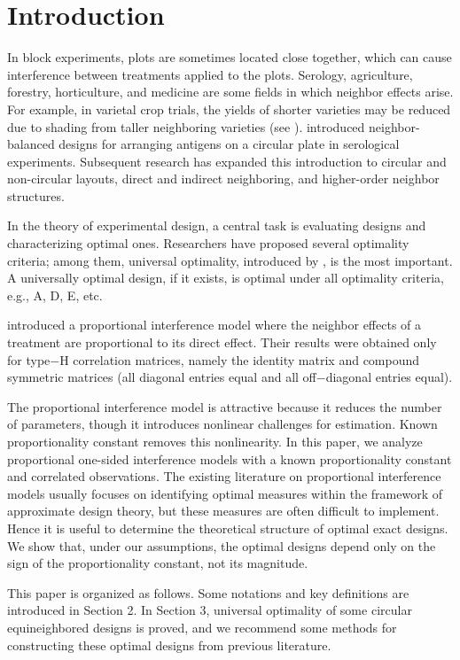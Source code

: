 \documentclass[twoside]{article}
\begin{document}
\section{Introduction}
In block experiments, plots are sometimes located close together, which can cause interference between treatments applied to the plots. Serology, agriculture, forestry, horticulture, and medicine are some fields in which neighbor effects arise. For example, in varietal crop trials, the yields of shorter varieties may be reduced due to shading from taller neighboring varieties (see \cite{KL84}). \cite{R67} introduced neighbor-balanced designs for arranging antigens on a circular plate in serological experiments. Subsequent research has expanded this introduction to circular and non-circular layouts, direct and indirect neighboring, and higher-order neighbor structures.

In the theory of experimental design, a central task is evaluating designs and characterizing optimal ones. Researchers have proposed several optimality criteria; among them, universal optimality, introduced by \cite{K75}, is the most important. A universally optimal design, if it exists, is optimal under all optimality criteria, e.g., A, D, E, etc.

\cite{LZA15} introduced a proportional interference model where the neighbor effects of a treatment are proportional to its direct effect. Their results were obtained only for type$-$H correlation matrices, namely the identity matrix and compound symmetric matrices (all diagonal entries equal and all off$-$diagonal entries equal).

The proportional interference model is attractive because it reduces the number of parameters, though it introduces nonlinear challenges for estimation. Known proportionality constant removes this nonlinearity. In this paper, we analyze proportional one-sided interference models with a known proportionality constant and correlated observations. The existing literature on proportional interference models usually focuses on identifying optimal measures within the framework of approximate design theory, but these measures are often difficult to implement. Hence it is useful to determine the theoretical structure of optimal exact designs. We show that, under our assumptions, the optimal designs depend only on the sign of the proportionality constant, not its magnitude.

This paper is organized as follows. Some notations and key definitions are introduced in Section 2. In Section 3, universal optimality of some circular equineighbored designs is proved, and we recommend some methods for constructing these optimal designs from previous literature.
\end{document}
